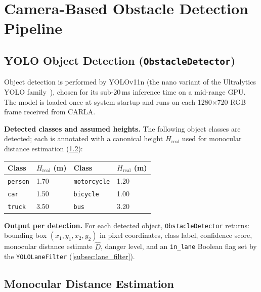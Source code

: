 \documentclass[12pt,a4paper]{article}
\begin{document}
\section{Camera-Based Obstacle Detection Pipeline}
\label{sec:camera}

\subsection{YOLO Object Detection (\texttt{ObstacleDetector})}
\label{subsec:yolo}

Object detection is performed by YOLOv11n (the nano variant of the Ultralytics
YOLO family~\cite{ultralytics2023}), chosen for its sub-20\,ms inference time
on a mid-range GPU.  The model is loaded once at system startup and runs on
each 1280$\times$720 RGB frame received from CARLA.

\textbf{Detected classes and assumed heights.}
The following object classes are detected; each is annotated with a canonical
height $H_{\text{real}}$ used for monocular distance estimation
(\cref{subsec:monocular}):

\begin{center}
\begin{tabular}{@{}lll l@{}}
\toprule
\textbf{Class} & $H_{\text{real}}$ (m) &
\textbf{Class} & $H_{\text{real}}$ (m) \\
\midrule
\texttt{person}     & 1.70 & \texttt{motorcycle} & 1.20 \\
\texttt{car}        & 1.50 & \texttt{bicycle}    & 1.00 \\
\texttt{truck}      & 3.50 & \texttt{bus}        & 3.20 \\
\bottomrule
\end{tabular}
\end{center}

\textbf{Output per detection.}
For each detected object, \texttt{ObstacleDetector} returns: bounding box
$(x_1,y_1,x_2,y_2)$ in pixel coordinates, class label, confidence score,
monocular distance estimate $\hat{D}$, danger level, and an \texttt{in\_lane}
Boolean flag set by the \texttt{YOLOLaneFilter} (\cref{subsec:lane_filter}).

\subsection{Monocular Distance Estimation}
\label{subsec:monocular}
\end{document}
